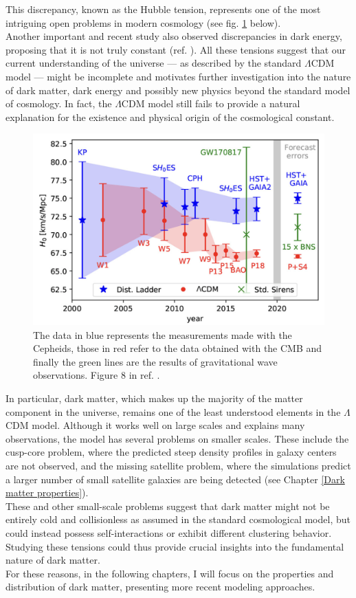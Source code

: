 This discrepancy, known as the Hubble tension, represents one of the most intriguing open problems in modern cosmology (see fig. \ref{Hubble tension} below).\\ Another important and recent study also observed discrepancies in dark energy, proposing that it is not truly constant (ref. \cite{DESI_DarkEnergy}). 
All these tensions suggest that our current understanding of the universe — as described by the standard $\Lambda$CDM model — might be incomplete and motivates further investigation into the nature of dark matter, dark energy and possibly new physics beyond the standard model of cosmology. In fact, the $\Lambda $CDM model still fails to provide a natural explanation for the existence and physical origin of the cosmological constant.

\begin{figure}[h!]
\centering
    \includegraphics[width=0.60\linewidth]{Images/Chapter1/Hubble tension.png}
    \caption[Hubble tension]{The data in blue represents the measurements made with the Cepheids, those in red refer to the data obtained with the CMB and finally the green lines are the results of gravitational wave observations. Figure 8 in ref. \cite{Dark-Energy-in-Light-of-Multi-Messenger-Gravitational-Wave-Astronomy}.}
\label{Hubble tension}
\end{figure}

In particular, dark matter, which makes up the majority of the matter component in the universe, remains one of the least understood elements in the $\Lambda$CDM model. Although it works well on large scales and explains many observations, the model has several problems on smaller scales. These include the cusp-core problem, where the predicted steep density profiles in galaxy centers are not observed, and the missing satellite problem, where the simulations predict a larger number of small satellite galaxies are being detected (see Chapter \ref{Dark matter properties}).\\ These and other small-scale problems suggest that dark matter might not be entirely cold and collisionless as assumed in the standard cosmological model, but could instead possess self-interactions or exhibit different clustering behavior. Studying these tensions could thus provide crucial insights into the fundamental nature of dark matter.\\ For these reasons, in the following chapters, I will focus on the properties and distribution of dark matter, presenting more recent modeling approaches.